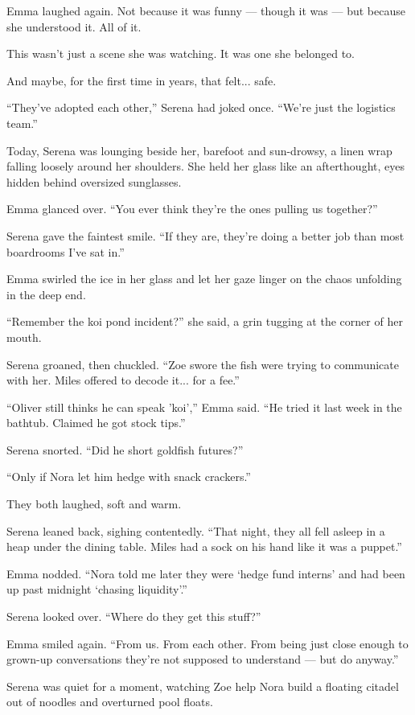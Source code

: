 Emma laughed again. Not because it was funny --- though it was --- but because she understood it. 
All of it.

This wasn’t just a scene she was watching.
It was one she belonged to.

And maybe, for the first time in years, that felt... safe.

``They’ve adopted each other,'' Serena had joked once. ``We’re just the logistics team.''

Today, Serena was lounging beside her, barefoot and sun-drowsy, a linen wrap falling loosely around her 
shoulders. 
She held her glass like an afterthought, eyes hidden behind oversized sunglasses.

Emma glanced over. ``You ever think they’re the ones pulling us together?''

Serena gave the faintest smile. ``If they are, they’re doing a better job than most boardrooms I’ve sat in.''

Emma swirled the ice in her glass and let her gaze linger on the chaos unfolding in the deep end.

``Remember the koi pond incident?'' she said, a grin tugging at the corner of her mouth.

Serena groaned, then chuckled. ``Zoe swore the fish were trying to communicate with her. Miles offered to decode 
it... for a fee.''

``Oliver still thinks he can speak 'koi','' Emma said. ``He tried it last week in the bathtub. Claimed he got 
stock tips.''

Serena snorted. ``Did he short goldfish futures?''

``Only if Nora let him hedge with snack crackers.''

They both laughed, soft and warm.

Serena leaned back, sighing contentedly. ``That night, they all fell asleep in a heap under the dining table. 
Miles had a sock on his hand like it was a puppet.''

Emma nodded. ``Nora told me later they were ‘hedge fund interns’ and had been up past midnight 
‘chasing liquidity’.''

Serena looked over. ``Where do they get this stuff?''

Emma smiled again. ``From us. From each other. From being just close enough to grown-up conversations 
they’re not supposed to understand — but do anyway.''

Serena was quiet for a moment, watching Zoe help Nora build a floating citadel out of noodles and overturned pool floats.

